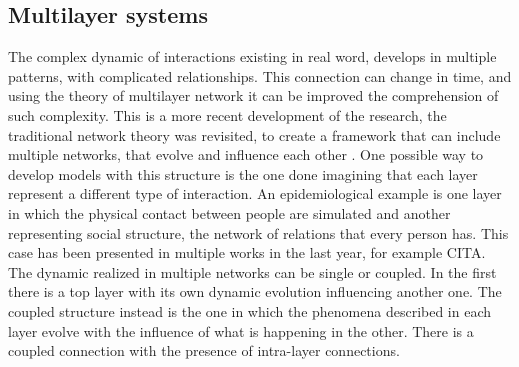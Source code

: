 \subsection{Multilayer systems}

The complex dynamic of interactions existing in real word, develops in multiple patterns, with complicated relationships. This connection can change in time, and using the theory of multilayer network it can be improved the comprehension of such complexity. This is a more recent development of the research, the traditional network theory was revisited, to create a framework that can include multiple networks, that evolve and influence each other \cite{DeDomenico2016}. 
One possible way to develop models with this structure is the one done imagining that each layer represent a different type of interaction. An epidemiological example is one layer in which the physical contact between people are simulated and another representing social structure, the network of relations that every person has. This case has been presented in multiple works in the last year, for example CITA. 
The dynamic realized in multiple networks can be single or coupled. In the first there is a top layer with its own dynamic evolution influencing another one. The coupled structure instead is the one in which the phenomena described in each layer evolve with the influence of what is happening in the other. There is a coupled connection with the presence of intra-layer connections.




